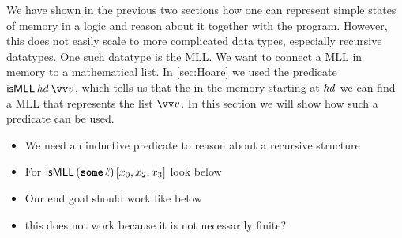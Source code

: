 \documentclass[thesis.tex]{subfiles}
\begin{document}
We have shown in the previous two sections how one can represent simple states of memory in a logic and reason about it together with the program. However, this does not easily scale to more complicated data types, especially recursive datatypes. One such datatype is the MLL. We want to connect a MLL in memory to a mathematical list. In \cref*{sec:Hoare} we used the predicate $\textlog{isMLL}\, \langv{hd}\, \vect{v}$, which tells us that the in the memory starting at $\mathit{hd}$ we can find a MLL that represents the list $\vect{v}$. In this section we will show how such a predicate can be used.

\begin{itemize}
  \item We need an inductive predicate to reason about a recursive structure
  \item For $\textsf{\upshape isMLL}\,(\operatorname{\texttt{\bfseries some}}\ell)\,[x_0,x_2,x_3]$ look below
\end{itemize}
\begin{center}
\end{center}
\begin{itemize}
  \item Our end goal should work like below
  \item this does not work because it is not necessarily finite? 
\end{itemize}
\end{document}
